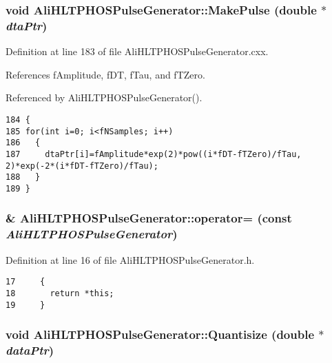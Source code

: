 \subsubsection{\setlength{\rightskip}{0pt plus 5cm}void Ali\-HLTPHOSPulse\-Generator::Make\-Pulse (double $\ast$ {\em dta\-Ptr})\hspace{0.3cm}{\tt  [private]}}\label{classAliHLTPHOSPulseGenerator_AliHLTPHOSPulseGeneratord0}




Definition at line 183 of file Ali\-HLTPHOSPulse\-Generator.cxx.

References f\-Amplitude, f\-DT, f\-Tau, and f\-TZero.

Referenced by Ali\-HLTPHOSPulse\-Generator().

\footnotesize\begin{verbatim}184 {
185 for(int i=0; i<fNSamples; i++)
186   {
187     dtaPtr[i]=fAmplitude*exp(2)*pow((i*fDT-fTZero)/fTau, 2)*exp(-2*(i*fDT-fTZero)/fTau);
188   }  
189 }
\end{verbatim}\normalsize 


\subsubsection{\& Ali\-HLTPHOSPulse\-Generator::operator= (const  {\em Ali\-HLTPHOSPulse\-Generator})\hspace{0.3cm}{\tt  [inline]}}\label{classAliHLTPHOSPulseGenerator_AliHLTPHOSPulseGeneratora4}




Definition at line 16 of file Ali\-HLTPHOSPulse\-Generator.h.

\footnotesize\begin{verbatim}17     {
18       return *this; 
19     }
\end{verbatim}\normalsize 


\subsubsection{\setlength{\rightskip}{0pt plus 5cm}void Ali\-HLTPHOSPulse\-Generator::Quantisize (double $\ast$ {\em data\-Ptr})}\label{classAliHLTPHOSPulseGenerator_AliHLTPHOSPulseGeneratora11}


